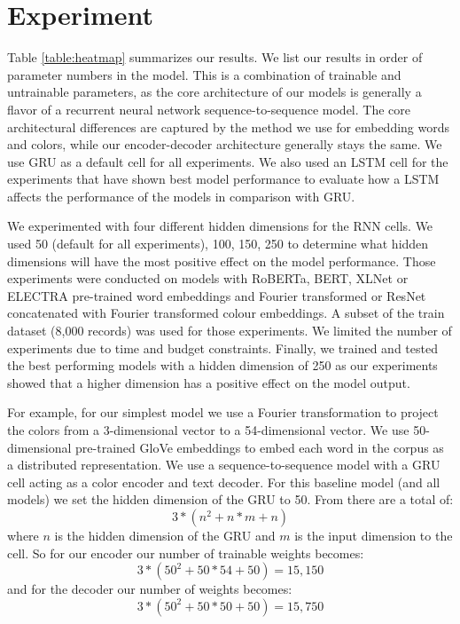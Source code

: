 \section{Experiment}

Table \ref{table:heatmap} summarizes our results. We list our results in order of parameter numbers in the model. This is a combination of trainable and untrainable parameters, as the core architecture of our models is generally a flavor of a recurrent neural network sequence-to-sequence model. The core architectural differences are captured by the method we use for embedding words and colors, while our encoder-decoder architecture generally stays the same. We use GRU as a default cell for all experiments. We also used an LSTM cell for the experiments that have shown best model performance to evaluate how a LSTM affects the performance of the models in comparison with GRU.

\par
We experimented with four different hidden dimensions for the RNN cells. We used 50 (default for all experiments), 100, 150, 250 to determine what hidden dimensions will have the most positive effect on the model performance. Those experiments were conducted on models with RoBERTa, BERT, XLNet or ELECTRA pre-trained word embeddings and Fourier transformed or ResNet concatenated with Fourier transformed colour embeddings. A subset of the train dataset (8,000 records) was used for those experiments. We limited the number of experiments due to time and budget constraints. Finally, we trained and tested the best performing models with a hidden dimension of 250 as our experiments showed that a higher dimension has a positive effect on the model output.

\par
For example, for our simplest model we use a Fourier transformation to project the colors from a 3-dimensional vector to a 54-dimensional vector. We use 50-dimensional pre-trained GloVe embeddings to embed each word in the corpus as a distributed representation. We use a sequence-to-sequence model with a GRU cell acting as a color encoder and text decoder.  For this baseline model (and all models) we set the hidden dimension of the GRU to 50. From \citep{dey-2017-gru} there are a total of:
\begin{equation}
  3*(n^2 + n*m +n)
\end{equation}
where \(n\) is the hidden dimension of the GRU and \(m\) is the input dimension to the cell. So for our encoder our number of trainable weights becomes:
\begin{equation}
  3*(50^2 + 50*54 +50) = 15,150
\end{equation}
and for the decoder our number of weights becomes:
\begin{equation}
  3*(50^2 + 50*50 +50) = 15,750
\end{equation}

